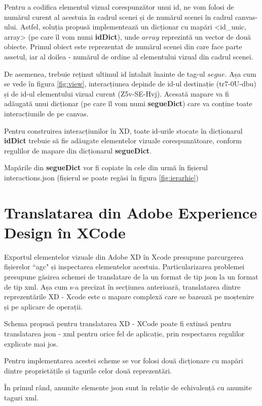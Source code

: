 Pentru a codifica elementul vizual corespunzător unui id, ne vom folosi de numărul curent al acestuia în cadrul scenei și de numărul scenei în cadrul canvas-ului. Astfel, soluția propusă implementează un dicționar cu mapări <id_unic, array> (pe care îl vom numi \textbf{idDict}), unde $array$ reprezintă un vector de două obiecte. Primul obiect este reprezentat de numărul scenei din care face parte assetul, iar al doilea - numărul de ordine al elementului vizual din cadrul scenei.

De asemenea, trebuie reținut ultimul id întalnit înainte de tag-ul $segue$. Așa cum se vede în figura \ref{fig:view}, interacțiunea depinde de id-ul destinație (tr7-0U-dbu) și de id-ul elementului vizual curent (Z5v-SE-Hvj). Acesată mapare va fi adăugată unui dicționar (pe care îl vom numi \textbf{segueDict}) care va conține toate interacțiunile de pe canvas.

Pentru construirea interacțiunilor în XD, toate id-urile stocate în dicționarul \textbf{idDict} trebuie să fie adăugate elementelor vizuale corespunzătoare, conform regulilor de mapare din dicționarul \textbf{segueDict}.

Mapările din \textbf{segueDict} vor fi copiate în cele din urmă în fișierul interactions.json (fișierul se poate regăsi în figura \ref{fig:ierarhie})

\section{Translatarea din Adobe Experience Design în XCode}\label{xd2xcodev1}

Exportul elementelor vizuale din Adobe XD în Xcode presupune parcurgerea fișierelor ``agc" și inspectarea elementelor acestuia. Particularizarea problemei presupune găsirea schemei de translatare de la un format de tip json la un format de tip xml. Așa cum s-a precizat în secțiunea anterioară, translatarea dintre reprezentările XD - Xcode este o mapare complexă care se bazează pe moștenire și pe aplicare de operații. 

Schema propusă pentru translatarea XD - XCode poate fi extinsă pentru translatarea json - xml pentru orice fel de aplicație, prin respectarea regulilor explicate mai jos. 

Pentru implementarea acestei scheme se vor folosi două dicționare cu mapări dintre proprietățile și tagurile celor două reprezentări. 

În primul rând, anumite elemente json sunt în relație de echivalență cu anumite taguri xml. 
\\

